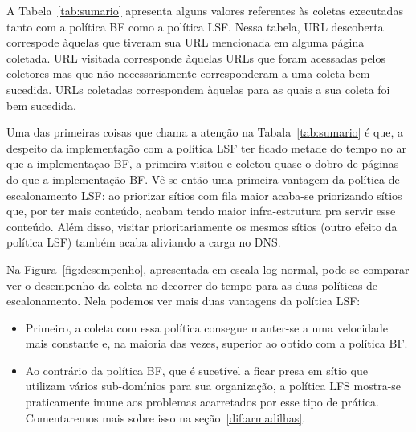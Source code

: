 \documentclass[10pt,twocolumn]{article}
\begin{document}
A Tabela~\ref{tab:sumario} apresenta alguns valores referentes às
coletas executadas tanto com a política BF como a política LSF.
Nessa tabela, URL descoberta correspode àquelas que tiveram sua URL
mencionada em alguma página coletada. URL visitada corresponde àquelas
URLs que foram acessadas pelos coletores mas que não necessariamente
corresponderam a uma coleta bem sucedida. URLs coletadas correspondem
àquelas para as quais a sua coleta foi bem sucedida.

Uma das primeiras coisas que chama a atenção na Tabala~\ref{tab:sumario}
é que, a despeito da implementação com a política LSF ter ficado metade
do tempo no ar que a implementaçao BF, a primeira visitou e coletou
quase o dobro de páginas do que a implementação BF. Vê-se então
uma primeira vantagem da política de escalonamento LSF: ao priorizar
sítios com fila maior acaba-se priorizando sítios que, por
ter mais conteúdo, acabam tendo maior infra-estrutura
pra servir esse conteúdo. Além disso, visitar prioritariamente os mesmos
sítios (outro efeito da política LSF) também acaba aliviando a carga no DNS.

Na Figura~\ref{fig:desempenho}, apresentada em escala log-normal,
pode-se comparar ver o desempenho da
coleta no decorrer do tempo para as duas políticas de escalonamento.
Nela podemos ver mais duas vantagens da política LSF:
\begin{itemize}
\item Primeiro, a coleta com essa política consegue manter-se a uma
velocidade mais constante e, na maioria das vezes, superior ao obtido
com a política BF.
\item Ao contrário da política BF, que é sucetível a ficar presa em
sítio que utilizam vários sub-domínios para sua organização, a política
LFS mostra-se praticamente imune aos problemas acarretados por esse tipo
de prática. Comentaremos mais sobre isso na seção~\ref{dif:armadilhas}.
\end{itemize}

\begin{figure*}
  \centering
  \mbox{
 }
 \mbox{
  }
  \caption{Desempenho do coletor com diferentes políticas de
escalonamento}
  \label{fig:desempenho}
\end{figure*}


\end{document}
